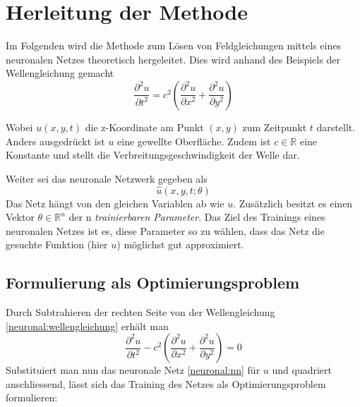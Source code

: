 %
%
%
%

\section{Herleitung der Methode\label{neuronal:section:herleitung}}

Im Folgenden wird die Methode zum Lösen von Feldgleichungen mittels eines neuronalen Netzes theoretisch hergeleitet.
Dies wird anhand des Beispiels der Wellengleichung gemacht
\begin{equation}
    \frac{\partial^2 u}{\partial t^2} = c^2 \left( \frac{\partial^2 u}{\partial x^2} + \frac{\partial^2 u}{\partial y^2} \right)
    \label{neuronal:wellengleichung}
\end{equation}

Wobei \( u(x, y, t) \) die z-Koordinate am Punkt \( (x, y) \) zum Zeitpunkt \( t \) darstellt.
Anders ausgedrückt ist \( u \) eine gewellte Oberfläche. Zudem ist \( c \in \mathbb{R} \) eine Konstante und stellt die Verbreitungsgeschwindigkeit der Welle dar.

Weiter sei das neuronale Netzwerk gegeben als
\begin{equation}
    \hat{u}(x, y, t; \theta)
    \label{neuronal:nn}
\end{equation}
Das Netz hängt von den gleichen Variablen ab wie \( u \).
Zusätzlich besitzt es einen Vektor \( \theta \in \mathbb{R}^n \) der n \emph{trainierbaren Parameter}.
Das Ziel des Trainings eines neuronalen Netzes ist es, diese Parameter so zu wählen, dass das Netz die gesuchte Funktion (hier \( u \)) möglichst gut approximiert.


\subsection{Formulierung als Optimierungsproblem}\label{neuronal:subsection:optimierungsproblem}
Durch Subtrahieren der rechten Seite von der Wellengleichung \eqref{neuronal:wellengleichung} erhält man
\begin{equation}
    \frac{\partial^2 u}{\partial t^2} - c^2 \left( \frac{\partial^2 u}{\partial x^2} + \frac{\partial^2 u}{\partial y^2} \right) = 0
\end{equation}
Substituiert man nun das neuronale Netz \eqref{neuronal:nn} für \( u \) und quadriert anschliessend, lässt sich das Training des Netzes als Optimierungsproblem formulieren:\newline

